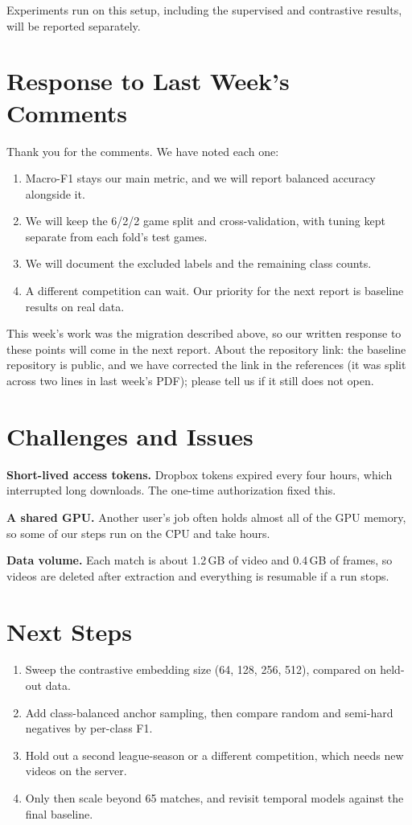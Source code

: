 \documentclass[11pt]{article}
\begin{document}
Experiments run on this setup, including the supervised and contrastive results, will be reported
separately.

\section*{Response to Last Week's Comments}
Thank you for the comments. We have noted each one:
\begin{enumerate}[noitemsep]
  \item Macro-F1 stays our main metric, and we will report balanced accuracy alongside it.
  \item We will keep the 6/2/2 game split and cross-validation, with tuning kept separate from each fold's
        test games.
  \item We will document the excluded labels and the remaining class counts.
  \item A different competition can wait. Our priority for the next report is baseline results on real data.
\end{enumerate}
This week's work was the migration described above, so our written response to these points will come in
the next report. About the repository link: the baseline repository is public, and we have corrected the
link in the references (it was split across two lines in last week's PDF); please tell us if it still does not
open.

\section*{Challenges and Issues}
\textbf{Short-lived access tokens.} Dropbox tokens expired every four hours, which interrupted long downloads.
The one-time authorization fixed this.

\textbf{A shared GPU.} Another user's job often holds almost all of the GPU memory, so some of our steps run on
the CPU and take hours.

\textbf{Data volume.} Each match is about 1.2\,GB of video and 0.4\,GB of frames, so videos are deleted after
extraction and everything is resumable if a run stops.

\section*{Next Steps}
\begin{enumerate}[noitemsep]
  \item Sweep the contrastive embedding size (64, 128, 256, 512), compared on held-out data.
  \item Add class-balanced anchor sampling, then compare random and semi-hard negatives by per-class F1.
  \item Hold out a second league-season or a different competition, which needs new videos on the server.
  \item Only then scale beyond 65 matches, and revisit temporal models against the final baseline.
\end{enumerate}
\end{document}
